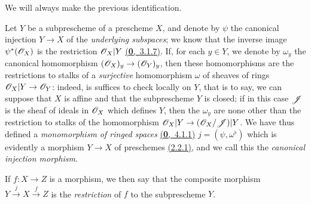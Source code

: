 We will always make the previous identification.
\begin{env}[4.1.7]
\label{1.4.1.7}
Let $Y$ be a subprescheme of a prescheme $X$, and denote by $\psi$ the canonical injection
$Y\to X$ of the {\em underlying subspaces}; we know that the inverse image $\psi^*(\mathscr{O}_X)$ is
the restriction $\mathscr{O}_X|Y$ \hyperref[0.3.7.1]{(\textbf{0},~3.1.7)}. If, for each $y\in Y$,
we denote by $\omega_y$ the canonical homomorphism $(\mathscr{O}_X)_y\to(\mathscr{O}_Y)_y$, then these
homomorphisms are the restrictions to stalks of a {\em surjective} homomorphism $\omega$
of sheaves of rings $\mathscr{O}_X|Y\to\mathscr{O}_Y$: indeed, is suffices to check locally on $Y$, that is
to say, we can suppose that $X$ is affine and that the subprescheme $Y$ is closed; if in this
case $\mathscr{J}$ is the sheaf of ideals in $\mathscr{O}_X$ which defines $Y$, then the $\omega_y$ are
none other than the restriction to stalks of the homomorphism $\mathscr{O}_X|Y\to(\mathscr{O}_X/\mathscr{J})|Y$.
We have thus defined a
{\em monomorphism of ringed spaces} \hyperref[0.4.1.1]{(\textbf{0},~4.1.1)}
$j=(\psi,\omega^\flat)$ which is evidently a morphism $Y\to X$ of
preschemes \hyperref[1.2.2.1]{(2.2.1)}, and we call this the
{\em canonical injection morphism}.

If $f:X\to Z$ is a morphism, we then say that the composite morphism
$Y\xrightarrow{j}X\xrightarrow{f}Z$ is the {\em restriction} of $f$ to the subprescheme $Y$.
\end{env}


